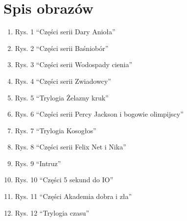 \documentclass{article}
\begin{document}
\section{Spis obrazów}
\begin{enumerate}
    \item Rys. 1 “Części serii Dary Anioła”

    \item Rys. 2  “Części serii Baśniobór”

    \item Rys. 3 “Części serii Wodospady cienia”
	
	\item Rys. 4 “Części serii Zwiadowcy”
	
	\item Rys. 5 “Trylogia Żelazny kruk”

    \item Rys. 6 “Części serii Percy Jackson i bogowie olimpijscy”

    \item Rys. 7 “Trylogia Kosogłos”
	
	\item Rys. 8 “Części serii Felix Net i Nika”
	
	\item Rys. 9 “Intruz”

    \item Rys. 10 “Części 5 sekund do IO”

    \item Rys. 11 “Części Akademia dobra i zła”
	
	\item Rys. 12 “Trylogia czasu”

\end{enumerate}
\end{document}
